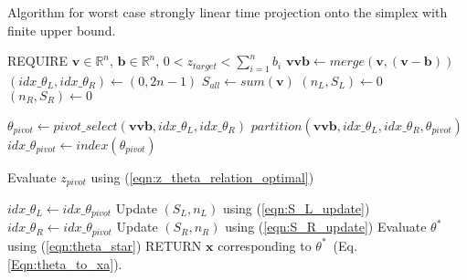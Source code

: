 \documentclass{article}
\begin{document}
\begin{algorithm}
\caption{Algorithm for worst case strongly linear time projection onto the simplex with finite upper bound.}
\label{Fig:Algo3}
\begin{algorithmic}\STATE REQUIRE $\mathbf{v}\in {\mathbb{R}}^n$,  $\mathbf{b} \in {\mathbb{R}}^n$, $ 0 < z_{target} < \sum_{i=1}^n b_i$
\STATE $\mathbf{vvb} \leftarrow merge(\mathbf{v,(v-b)})$ 
\STATE $(idx\_\theta_L, idx\_\theta_R) \leftarrow (0,2n-1)$
\STATE $S_{all} \leftarrow sum(\mathbf{v})$
\STATE $(n_L, S_L) \leftarrow 0 $
\STATE $(n_R, S_R) \leftarrow 0 $


\STATE $\theta_{pivot}  \leftarrow pivot\_select( \mathbf{vvb}, idx\_\theta_L, idx\_\theta_R)$
\STATE $partition(\mathbf{vvb},idx\_\theta_L,idx\_\theta_R, \theta_{pivot})$
\STATE $idx\_\theta_{pivot} \leftarrow index(\theta_{pivot}) $

\STATE Evaluate $z_{pivot}$ using (\ref{eqn:z_theta_relation_optimal})

\STATE $idx\_\theta_L \leftarrow idx\_\theta_{pivot}$
\STATE Update $(S_L,n_L)$ using (\ref{eqn:S_L_update})
\ELSE
\STATE $idx\_\theta_R \leftarrow idx\_\theta_{pivot}$
\STATE Update $(S_R,n_R)$ using (\ref{eqn:S_R_update})
\ENDIF
\ENDWHILE
\STATE Evaluate $\theta^*$ using (\ref{eqn:theta_star})
\STATE RETURN $\mathbf{x}$ corresponding to $\theta^*$~(Eq.\ref{Eqn:theta_to_xa}).
\end{algorithmic}
\end{algorithm}
\end{document}
